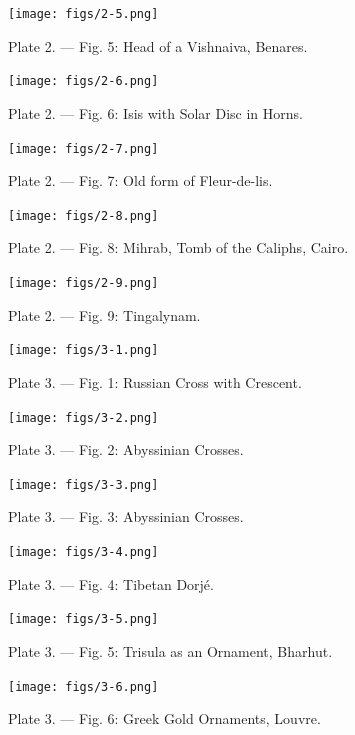 \documentclass[a4paper, 11pt, oneside, english, landscape, twocolumn]{article}
\begin{document}
\begin{figure}[H]
\centering
\texttt{[image: figs/2-5.png]}
\caption{Plate 2. --- Fig. 5: Head of a Vishnaiva, Benares.}
\end{figure}

\begin{figure}[H]
\centering
\texttt{[image: figs/2-6.png]}
\caption{Plate 2. --- Fig. 6: Isis with Solar Disc in Horns.}
\end{figure}

\begin{figure}[H]
\centering
\texttt{[image: figs/2-7.png]}
\caption{Plate 2. --- Fig. 7: Old form of Fleur-de-lis.}
\end{figure}

\begin{figure}[H]
\centering
\texttt{[image: figs/2-8.png]}
\caption{Plate 2. --- Fig. 8: Mihrab, Tomb of the Caliphs, Cairo.}
\end{figure}

\begin{figure}[H]
\centering
\texttt{[image: figs/2-9.png]}
\caption{Plate 2. --- Fig. 9: Tingalynam.}
\end{figure}

\begin{figure}[H]
\centering
\texttt{[image: figs/3-1.png]}
\caption{Plate 3. --- Fig. 1: Russian Cross with Crescent.}
\end{figure}

\begin{figure}[H]
\centering
\texttt{[image: figs/3-2.png]}
\caption{Plate 3. --- Fig. 2: Abyssinian Crosses.}
\end{figure}

\begin{figure}[H]
\centering
\texttt{[image: figs/3-3.png]}
\caption{Plate 3. --- Fig. 3: Abyssinian Crosses.}
\end{figure}

\begin{figure}[H]
\centering
\texttt{[image: figs/3-4.png]}
\caption{Plate 3. --- Fig. 4: Tibetan Dorjé.}
\end{figure}

\begin{figure}[H]
\centering
\texttt{[image: figs/3-5.png]}
\caption{Plate 3. --- Fig. 5: Trisula as an Ornament, Bharhut.}
\end{figure}

\begin{figure}[H]
\centering
\texttt{[image: figs/3-6.png]}
\caption{Plate 3. --- Fig. 6: Greek Gold Ornaments, Louvre.}
\end{figure}
\end{document}
